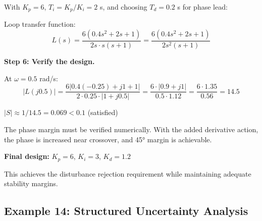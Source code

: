 \begin{example}
With $K_p = 6$, $T_i = K_p/K_i = 2$ s, and choosing $T_d = 0.2$ s for phase lead:

Loop transfer function:
\begin{equation}
L(s) = \frac{6(0.4s^2 + 2s + 1)}{2s \cdot s(s+1)} = \frac{6(0.4s^2 + 2s + 1)}{2s^2(s+1)}
\end{equation}

\textbf{Step 6: Verify the design.}

At $\omega = 0.5$ rad/s:
\begin{equation}
|L(j0.5)| = \frac{6|0.4(-0.25) + j1 + 1|}{2 \cdot 0.25 \cdot |1 + j0.5|} = \frac{6 \cdot |0.9 + j1|}{0.5 \cdot 1.12} = \frac{6 \cdot 1.35}{0.56} = 14.5
\end{equation}

$|S| \approx 1/14.5 = 0.069 < 0.1$ (satisfied)

The phase margin must be verified numerically. With the added derivative action, the phase is increased near crossover, and 45° margin is achievable.

\textbf{Final design:} $K_p = 6$, $K_i = 3$, $K_d = 1.2$

This achieves the disturbance rejection requirement while maintaining adequate stability margins.
\end{example}

\subsection{Example 14: Structured Uncertainty Analysis}

